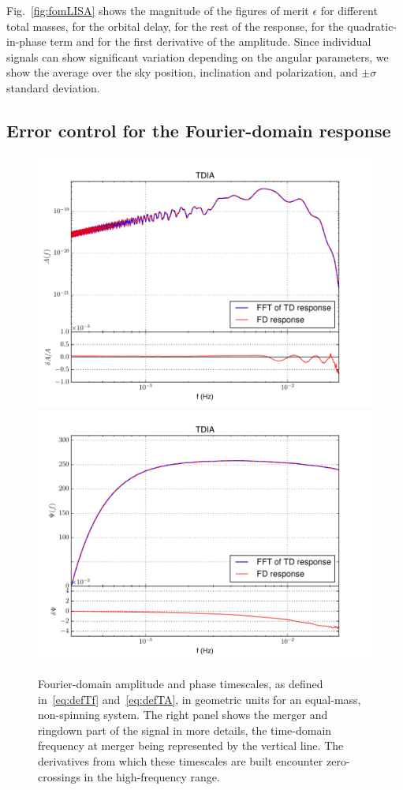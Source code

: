 \documentclass[aps,showpacs,%
prd,superscriptaddress,nofootinbib]{revtex4}
\begin{document}
Fig.~\ref{fig:fomLISA} shows the magnitude of the figures of merit $\epsilon$ for different total masses, for the orbital delay, for the rest of the response, for the quadratic-in-phase term and for the first derivative of the amplitude. Since individual signals can show significant variation depending on the angular parameters, we show the average over the sky position, inclination and polarization, and $\pm \sigma$ standard deviation.


\subsection{Error control for the Fourier-domain response}
\label{subsec:errorsLISA}

\begin{figure}
  \centering
  \includegraphics[width=.48\linewidth]{plots/tdifdAamp.pdf}
  \hspace{0.2cm}
  \includegraphics[width=.48\linewidth]{plots/tdifdAphase.pdf}
  \caption{Fourier-domain amplitude and phase timescales, as defined in~\eqref{eq:defTf} and~\eqref{eq:defTA}, in geometric units for an equal-mass, non-spinning system. The right panel shows the merger and ringdown part of the signal in more details, the time-domain frequency at merger being represented by the vertical line. The derivatives from which these timescales are built encounter zero-crossings in the high-frequency range.}
  \label{fig:tdifdA}
\end{figure}
\end{document}
